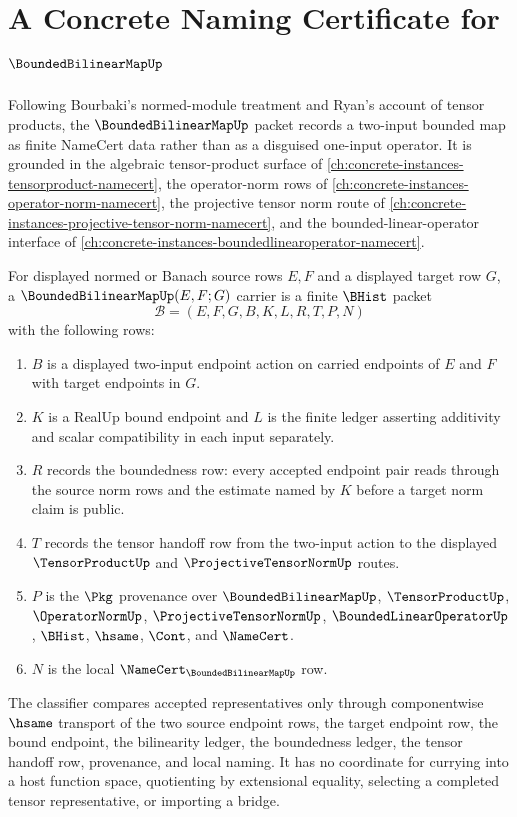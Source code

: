 \chapter{A Concrete Naming Certificate for $\BoundedBilinearMapUp$}
\label{ch:concrete-instances-bounded-bilinear-map-namecert}

Following Bourbaki's normed-module treatment and Ryan's account of tensor products, the $\BoundedBilinearMapUp$ packet records a two-input bounded map as finite NameCert data rather than as a disguised one-input operator. It is grounded in the algebraic tensor-product surface of \autoref{ch:concrete-instances-tensorproduct-namecert}, the operator-norm rows of \autoref{ch:concrete-instances-operator-norm-namecert}, the projective tensor norm route of \autoref{ch:concrete-instances-projective-tensor-norm-namecert}, and the bounded-linear-operator interface of \autoref{ch:concrete-instances-boundedlinearoperator-namecert}.

\begin{definition}
\label{def:bounded-bilinear-map-carrier}
For displayed normed or Banach source rows $E,F$ and a displayed target row $G$, a $\BoundedBilinearMapUp(E,F;G)$ carrier is a finite $\BHist$ packet
$$
\mathcal{B}=(E,F,G,B,K,L,R,T,P,N)
$$
with the following rows:
\begin{enumerate}
\item $B$ is a displayed two-input endpoint action on carried endpoints of $E$ and $F$ with target endpoints in $G$.
\item $K$ is a RealUp bound endpoint and $L$ is the finite ledger asserting additivity and scalar compatibility in each input separately.
\item $R$ records the boundedness row: every accepted endpoint pair reads through the source norm rows and the estimate named by $K$ before a target norm claim is public.
\item $T$ records the tensor handoff row from the two-input action to the displayed $\TensorProductUp$ and $\ProjectiveTensorNormUp$ routes.
\item $P$ is the $\Pkg$ provenance over $\BoundedBilinearMapUp$, $\TensorProductUp$, $\OperatorNormUp$, $\ProjectiveTensorNormUp$, $\BoundedLinearOperatorUp$, $\BHist$, $\hsame$, $\Cont$, and $\NameCert$.
\item $N$ is the local $\NameCert_{\BoundedBilinearMapUp}$ row.
\end{enumerate}
The classifier compares accepted representatives only through componentwise $\hsame$ transport of the two source endpoint rows, the target endpoint row, the bound endpoint, the bilinearity ledger, the boundedness ledger, the tensor handoff row, provenance, and local naming. It has no coordinate for currying into a host function space, quotienting by extensional equality, selecting a completed tensor representative, or importing a bridge.
\end{definition}

